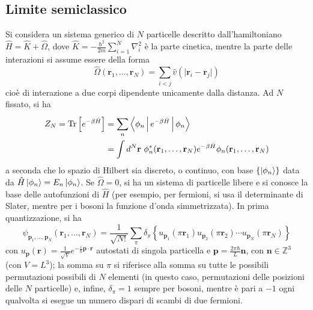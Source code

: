 \documentclass[11pt, a4paper]{scrartcl}
\theoremstyle{style}
\theoremstyle{style1}
\numberwithin{equation}{subsection}
\begin{document}
\subsection{Limite semiclassico}
Si considera un sistema generico di $N$ particelle descritto dall'hamiltoniano $\hat{H} = \hat{K} + \hat{\Omega }$, dove $\hat{K} = -\frac{\hbar ^2}{2m}\sum_{i=1}^{N} \nabla _i^2$ \`e la parte cinetica, mentre la parte delle interazioni si assume essere della forma
\[
\hat{\Omega }\left(\mathbf{r} _1, \ldots , \mathbf{r} _N\right)  = \sum_{i<j}^{} \hat{v} \left(\lvert \mathbf{r} _i - \mathbf{r} _j \rvert \right) 
\] 
cio\`e di interazione a due corpi dipendente unicamente dalla distanza.
Ad $N$ fissato, si ha
\[
	\begin{split}
		Z_N = \operatorname{Tr} \left[ e^{-\beta \hat{H}} \right]  &= \sum_{n}^{} \Braket{\phi _n|e^{-\beta \hat{H}}|\phi _n} \\
									   &= \int d^N \mathbf{r} \ \phi _n^* (\mathbf{r} _1, \ldots, \mathbf{r} _N) e^{-\beta \hat{H}} \phi _n (\mathbf{r}_1,\ldots,\mathbf{r} _N) 
	\end{split}
\] 
a seconda che lo spazio di Hilbert sia discreto, o continuo, con base $\left\{ \ket{\phi _n}  \right\} $ data da $\hat{H}\ket{\phi _n} = E_n \ket{\phi _n} $.
Se $\hat{\Omega }= 0$, si ha un sistema di particelle libere e si conosce la base delle autofunzioni di $\hat{H}$ (per esempio, per fermioni, si usa il determinante di Slater, mentre per i bosoni la funzione d'onda simmetrizzata).
In prima quantizzazione, si ha
\[
\psi _{\mathbf{p}_1 ,\ldots, \mathbf{p} _N} (\mathbf{r} _1,\ldots,\mathbf{r}_N) = \frac{1}{\sqrt{N!} } \sum_{\pi}^{} \delta _\pi \left\{ u_{\mathbf{p}_1}(\pi\mathbf{r} _1) u_{\mathbf{p} _2} (\pi\mathbf{r} _2) \cdots u_{\mathbf{p} _N} (\pi \mathbf{r} _N)   \right\} 
\] 
con $u_\mathbf{p} (\mathbf{r} ) = \frac{1}{\sqrt{V} }e^{-\frac{i}{\hbar }\mathbf{p} \cdot \mathbf{r} }$ autostati di singola particella e $\mathbf{p} = \frac{2\pi \hbar }{L}\mathbf{n} $, con $\mathbf{n} \in \mathbb{Z}^3$ (con $V=L^3$); la somma su $\pi$ si riferisce alla somma su tutte le possibili permutazioni possibili di $N$ elementi (in questo caso, permutazioni delle posizioni delle $N$ particelle) e, infine, $\delta _\pi = 1$ sempre per bosoni, mentre \`e pari a $-1$ ogni qualvolta si esegue un numero dispari di scambi di due fermioni.
\vspace{.5cm}
\end{document}
